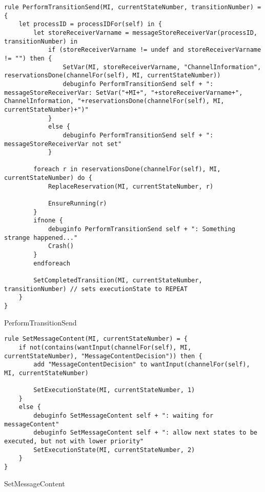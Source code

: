 \begin{listing}[H]
\begin{verbatim}
rule PerformTransitionSend(MI, currentStateNumber, transitionNumber) = {
    let processID = processIDFor(self) in {
        let storeReceiverVarname = messageStoreReceiverVar(processID, transitionNumber) in
            if (storeReceiverVarname != undef and storeReceiverVarname != "") then {
                SetVar(MI, storeReceiverVarname, "ChannelInformation", reservationsDone(channelFor(self), MI, currentStateNumber))
                debuginfo PerformTransitionSend self + ": messageStoreReceiverVar: SetVar("+MI+", "+storeReceiverVarname+", ChannelInformation, "+reservationsDone(channelFor(self), MI, currentStateNumber)+")"
            }
            else {
                debuginfo PerformTransitionSend self + ": messageStoreReceiverVar not set"
            }

        foreach r in reservationsDone(channelFor(self), MI, currentStateNumber) do {
            ReplaceReservation(MI, currentStateNumber, r)

            EnsureRunning(r)
        }
        ifnone {
            debuginfo PerformTransitionSend self + ": Something strange happened..."
            Crash()
        }
        endforeach

        SetCompletedTransition(MI, currentStateNumber, transitionNumber) // sets executionState to REPEAT
    }
}
\end{verbatim}
\caption{PerformTransitionSend}
\label{lst:asm:PerformTransitionSend}
\end{listing}




\begin{listing}[H]
\begin{verbatim}
rule SetMessageContent(MI, currentStateNumber) = {
    if not(contains(wantInput(channelFor(self), MI, currentStateNumber), "MessageContentDecision")) then {
        add "MessageContentDecision" to wantInput(channelFor(self), MI, currentStateNumber)

        SetExecutionState(MI, currentStateNumber, 1)
    }
    else {
        debuginfo SetMessageContent self + ": waiting for messageContent"
        debuginfo SetMessageContent self + ": allow next states to be executed, but not with lower priority"
        SetExecutionState(MI, currentStateNumber, 2)
    }
}
\end{verbatim}
\caption{SetMessageContent}
\label{lst:asm:SetMessageContent}
\end{listing}




